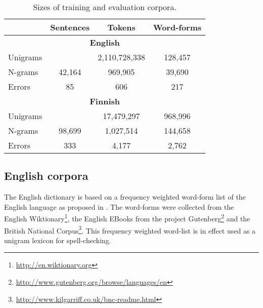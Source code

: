 \documentclass[postprint]{flammie}
\begin{document}
\begin{table}
    \caption{Sizes of training and evaluation corpora.
    \label{table:corpora}}
  \begin{center}
      \begin{tabular}{lccc}
        \hline
         & Sentences & Tokens & Word-forms \\
        \hline
        \multicolumn{4}{c}{\textbf{English}} \\
        \hline
        Unigrams &  & 2,110,728,338 & 128,457  \\
        N-grams & 42,164 & 969,905 & 39,690 \\
        Errors  & 85 & 606 & 217 \\
        \hline
        \multicolumn{4}{c}{\textbf{Finnish}} \\
        \hline
        Unigrams &  & 17,479,297 & 968,996 \\
        N-grams & 98,699 & 1,027,514 & 144,658 \\
        Errors  & 333 & 4,177 & 2,762 \\
        \hline
      \end{tabular}
  \end{center}
\end{table}

\subsection{English corpora}

The English dictionary is based on a frequency weighted word-form list of
the English language as proposed in \cite{norvig/2010}. The word-forms were
collected from the English Wiktionary\footnote{\url{http://en.wiktionary.org}},
the English EBooks from the project
Gutenberg\footnote{\url{http://www.gutenberg.org/browse/languages/en}} and the
British National
Corpus\footnote{\url{http://www.kilgarriff.co.uk/bnc-readme.html}}. This
frequency weighted word-list is in effect used as a unigram lexicon for spell-checking.
\end{document}
